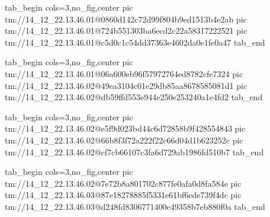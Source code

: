  
 
 
 
 

\qqSecCmtScr


\ifcmt
  tab_begin cols=3,no_fig,center
    pic tm://14_12_22.13.46.01@0860d142c72d99f804b9ed1513b4e2ab
    pic tm://14_12_22.13.46.01@724b551303ba6ecd2c22a58317222521
    pic tm://14_12_22.13.46.01@c5d0c1c54dd37363e4602da0e1fe0a47
  tab_end
\fi


\ifcmt
  tab_begin cols=3,no_fig,center
    pic tm://14_12_22.13.46.01@06a600eb96f57972764ed8782cfe7324
    pic tm://14_12_22.13.46.02@49ea3104c01e29db85aa8678585081d1
    pic tm://14_12_22.13.46.02@db59ffd553e944e250e253240a1e4fd2
  tab_end
\fi


\ifcmt
  tab_begin cols=3,no_fig,center
    pic tm://14_12_22.13.46.02@e5f9d023bd44c6d72858b9f428554843
    pic tm://14_12_22.13.46.02@66b8f3f72a222f22c66d04d1b623252c
    pic tm://14_12_22.13.46.02@cf7cb66107c3fa6d729ab1986fd510b7
  tab_end
\fi


\ifcmt
  tab_begin cols=3,no_fig,center
    pic tm://14_12_22.13.46.02@7e72b8a801702c877fe0afa0d8fa584e
    pic tm://14_12_22.13.46.03@87e18278885f5331e61bf6ede739f4dc
    pic tm://14_12_22.13.46.03@d248fd8306771400e49358b7eb880f0a
  tab_end
\fi

